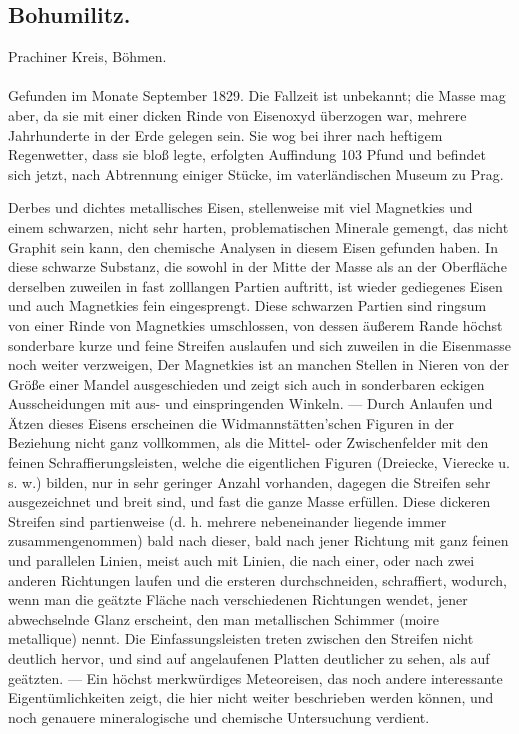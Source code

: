 \documentclass[a4paper, 11pt, oneside, polutonikogreek, german]{article}
\begin{document}
\subsection{Bohumilitz.}
\begin{center}
\small
Prachiner Kreis, Böhmen.
\end{center}
\paragraph{}
Gefunden im Monate September 1829. Die Fallzeit ist unbekannt; die Masse mag aber, da sie mit einer dicken Rinde von Eisenoxyd überzogen war, mehrere Jahrhunderte in der Erde gelegen sein. Sie wog bei ihrer nach heftigem Regenwetter, dass sie bloß legte, erfolgten Auffindung 103 Pfund und befindet sich jetzt, nach Abtrennung einiger Stücke, im vaterländischen Museum zu Prag.

Derbes und dichtes metallisches Eisen, stellenweise mit viel Magnetkies und einem schwarzen, nicht sehr harten, problematischen Minerale gemengt, das nicht Graphit sein kann, den chemische Analysen in diesem Eisen gefunden haben. In diese schwarze Substanz, die sowohl in der Mitte der Masse als an der Oberfläche derselben zuweilen in fast zolllangen Partien auftritt, ist wieder gediegenes Eisen und auch Magnetkies fein eingesprengt. Diese schwarzen Partien sind ringsum von einer Rinde von Magnetkies umschlossen, von dessen äußerem Rande höchst sonderbare kurze und feine Streifen auslaufen und sich zuweilen in die Eisenmasse noch weiter verzweigen, Der Magnetkies ist an manchen Stellen in Nieren von der Größe einer Mandel ausgeschieden und zeigt sich auch in sonderbaren eckigen Ausscheidungen mit aus- und einspringenden Winkeln. — Durch Anlaufen und Ätzen dieses Eisens erscheinen die Widmannstätten'schen Figuren in der Beziehung nicht ganz vollkommen, als die Mittel- oder Zwischenfelder mit den feinen Schraffierungsleisten, welche die eigentlichen Figuren (Dreiecke, Vierecke u. s. w.) bilden, nur in sehr geringer Anzahl vorhanden, dagegen die Streifen sehr ausgezeichnet und breit sind, und fast die ganze Masse erfüllen. Diese dickeren Streifen sind partienweise (d. h. mehrere nebeneinander liegende immer zusammengenommen) bald nach dieser, bald nach jener Richtung mit ganz feinen und parallelen Linien, meist auch mit Linien, die nach einer, oder nach zwei anderen Richtungen laufen und die ersteren durchschneiden, schraffiert, wodurch, wenn man die geätzte Fläche nach verschiedenen Richtungen wendet, jener abwechselnde Glanz erscheint, den man metallischen Schimmer (moire metallique) nennt. Die Einfassungsleisten treten zwischen den Streifen nicht deutlich hervor, und sind auf angelaufenen Platten deutlicher zu sehen, als auf geätzten. — Ein höchst merkwürdiges Meteoreisen, das noch andere interessante Eigentümlichkeiten zeigt, die hier nicht weiter beschrieben werden können, und noch genauere mineralogische und chemische Untersuchung verdient.
\end{document}
